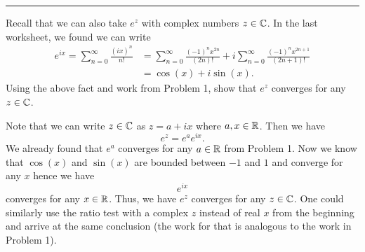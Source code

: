 \documentclass[12pt]{article} %
\begin{document}
\hrule
\begin{problem}
Recall that we can also take $e^z$ with complex numbers $z\in \mathbb{C}$. In the last worksheet, we found we can write
\begin{align*}
e^{ix} = \sum_{n=0}^\infty \frac{(ix)^n}{n!}&= \sum_{n=0}^\infty \frac{(-1)^n x^{2n}}{(2n)!} + i \sum_{n=0}^\infty \frac{(-1)^n x^{2n+1}}{(2n+1)!}\\
&= \cos(x) + i \sin(x).
\end{align*}
Using the above fact and work from Problem 1, show that $e^z$ converges for any $z\in \mathbb{C}$.
\end{problem}
\begin{solution}
    \item Note that we can write $z\in \mathbb{C}$ as $z=a+ix$ where $a,x\in \mathbb{R}$. Then we have
    \[
    e^z = e^ae^{ix}.
    \]
    We already found that $e^a$ converges for any $a\in \mathbb{R}$ from Problem 1.  Now we know that $\cos(x)$ and $\sin(x)$ are bounded between $-1$ and $1$ and converge for any $x$ hence we have
    \[
    e^{ix}
    \]
    converges for any $x\in \mathbb{R}$. Thus, we have $e^z$ converges for any $z\in \mathbb{C}$.  One could similarly use the ratio test with a complex $z$ instead of real $x$ from the beginning and arrive at the same conclusion (the work for that is analogous to the work in Problem 1).
\end{solution}
\end{document}
